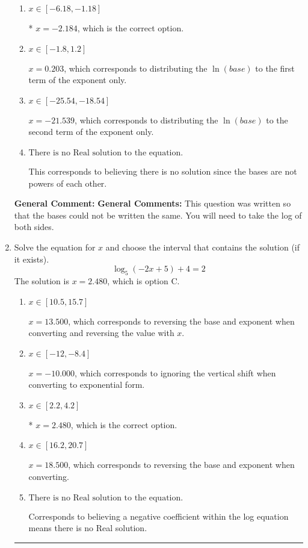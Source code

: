 \documentclass{extbook}[14pt]
\newcommand{\litem}[1]{\item #1

\rule{\textwidth}{0.4pt}}
\begin{document}
\begin{enumerate}
{\begin{enumerate}[label=\Alph*.]
$x = 2.000$, which corresponds to solving the numerators as equal while ignoring the bases are different.
\item \( x \in [-6.18, -1.18] \)

* $x = -2.184$, which is the correct option.
\item \( x \in [-1.8, 1.2] \)

$x = 0.203$, which corresponds to distributing the $\ln(base)$ to the first term of the exponent only.
\item \( x \in [-25.54, -18.54] \)

$x = -21.539$, which corresponds to distributing the $\ln(base)$ to the second term of the exponent only.
\item \( \text{There is no Real solution to the equation.} \)

This corresponds to believing there is no solution since the bases are not powers of each other.
\end{enumerate}

\textbf{General Comment:} \textbf{General Comments:} This question was written so that the bases could not be written the same. You will need to take the log of both sides.
}
\litem{
Solve the equation for $x$ and choose the interval that contains the solution (if it exists).
\[ \log_{5}{(-2x+5)}+4 = 2 \]The solution is \( x = 2.480 \), which is option C.\begin{enumerate}[label=\Alph*.]
\item \( x \in [10.5, 15.7] \)

$x = 13.500$, which corresponds to reversing the base and exponent when converting and reversing the value with $x$.
\item \( x \in [-12, -8.4] \)

$x = -10.000$, which corresponds to ignoring the vertical shift when converting to exponential form.
\item \( x \in [2.2, 4.2] \)

* $x = 2.480$, which is the correct option.
\item \( x \in [16.2, 20.7] \)

$x = 18.500$, which corresponds to reversing the base and exponent when converting.
\item \( \text{There is no Real solution to the equation.} \)

Corresponds to believing a negative coefficient within the log equation means there is no Real solution.
\end{enumerate}

}
\end{enumerate}
\end{document}
